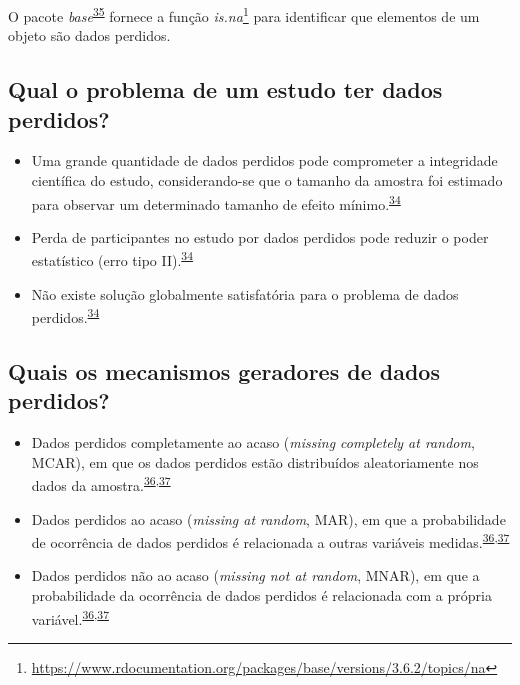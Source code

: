 \documentclass[
  a4paper,
]{book}
\renewcommand{\href}[2]{#2\footnote{\url{#1}}}
\newenvironment{infobox}[1]
  {
  \begin{itemize}
  \renewcommand{\labelitemi}{
    \raisebox{-.7\height}[0pt][0pt]{
      {\setkeys{Gin}{width=3em,keepaspectratio}
        \texttt{[image: \#1]}}
    }
  }
  \setlength{\fboxsep}{1em}
  \begin{blackbox}
  \item
  }
  {
  \end{blackbox}
  \end{itemize}
  }
\begin{document}
\begin{infobox}{images/Rlogo}
O pacote \emph{base}\textsuperscript{\protect\hyperlink{ref-base-2}{35}} fornece a função \href{https://www.rdocumentation.org/packages/base/versions/3.6.2/topics/na}{\emph{is.na}} para identificar que elementos de um objeto são dados perdidos.

\end{infobox}

\hypertarget{qual-o-problema-de-um-estudo-ter-dados-perdidos}{%
\subsection{Qual o problema de um estudo ter dados perdidos?}\label{qual-o-problema-de-um-estudo-ter-dados-perdidos}}

\begin{itemize}
\item
  Uma grande quantidade de dados perdidos pode comprometer a integridade científica do estudo, considerando-se que o tamanho da amostra foi estimado para observar um determinado tamanho de efeito mínimo.\textsuperscript{\protect\hyperlink{ref-Altman2007}{34}}
\item
  Perda de participantes no estudo por dados perdidos pode reduzir o poder estatístico (erro tipo II).\textsuperscript{\protect\hyperlink{ref-Altman2007}{34}}
\item
  Não existe solução globalmente satisfatória para o problema de dados perdidos.\textsuperscript{\protect\hyperlink{ref-Altman2007}{34}}
\end{itemize}

\hypertarget{quais-os-mecanismos-geradores-de-dados-perdidos}{%
\subsection{Quais os mecanismos geradores de dados perdidos?}\label{quais-os-mecanismos-geradores-de-dados-perdidos}}

\begin{itemize}
\item
  Dados perdidos completamente ao acaso (\emph{missing completely at random}, MCAR), em que os dados perdidos estão distribuídos aleatoriamente nos dados da amostra.\textsuperscript{\protect\hyperlink{ref-Heymans2022}{36},\protect\hyperlink{ref-carpenter2021}{37}}
\item
  Dados perdidos ao acaso (\emph{missing at random}, MAR), em que a probabilidade de ocorrência de dados perdidos é relacionada a outras variáveis medidas.\textsuperscript{\protect\hyperlink{ref-Heymans2022}{36},\protect\hyperlink{ref-carpenter2021}{37}}
\item
  Dados perdidos não ao acaso (\emph{missing not at random}, MNAR), em que a probabilidade da ocorrência de dados perdidos é relacionada com a própria variável.\textsuperscript{\protect\hyperlink{ref-Heymans2022}{36},\protect\hyperlink{ref-carpenter2021}{37}}
\end{itemize}
\end{document}
